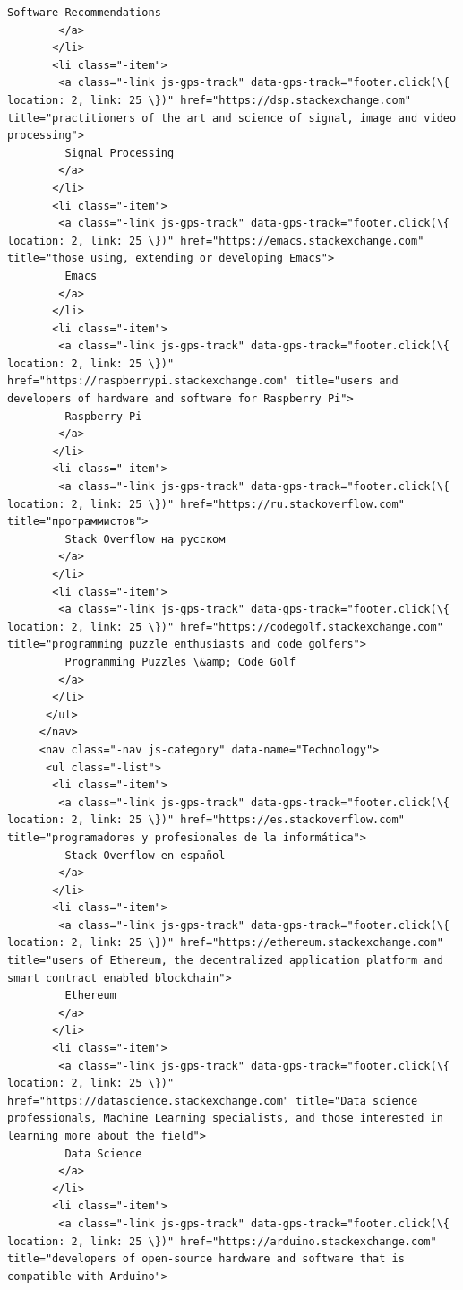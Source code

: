 \documentclass[11pt]{article}
\begin{document}
\begin{Verbatim}[commandchars=\\\{\}]
         Software Recommendations
        </a>
       </li>
       <li class="-item">
        <a class="-link js-gps-track" data-gps-track="footer.click(\{ location: 2, link: 25 \})" href="https://dsp.stackexchange.com" title="practitioners of the art and science of signal, image and video processing">
         Signal Processing
        </a>
       </li>
       <li class="-item">
        <a class="-link js-gps-track" data-gps-track="footer.click(\{ location: 2, link: 25 \})" href="https://emacs.stackexchange.com" title="those using, extending or developing Emacs">
         Emacs
        </a>
       </li>
       <li class="-item">
        <a class="-link js-gps-track" data-gps-track="footer.click(\{ location: 2, link: 25 \})" href="https://raspberrypi.stackexchange.com" title="users and developers of hardware and software for Raspberry Pi">
         Raspberry Pi
        </a>
       </li>
       <li class="-item">
        <a class="-link js-gps-track" data-gps-track="footer.click(\{ location: 2, link: 25 \})" href="https://ru.stackoverflow.com" title="программистов">
         Stack Overflow на русском
        </a>
       </li>
       <li class="-item">
        <a class="-link js-gps-track" data-gps-track="footer.click(\{ location: 2, link: 25 \})" href="https://codegolf.stackexchange.com" title="programming puzzle enthusiasts and code golfers">
         Programming Puzzles \&amp; Code Golf
        </a>
       </li>
      </ul>
     </nav>
     <nav class="-nav js-category" data-name="Technology">
      <ul class="-list">
       <li class="-item">
        <a class="-link js-gps-track" data-gps-track="footer.click(\{ location: 2, link: 25 \})" href="https://es.stackoverflow.com" title="programadores y profesionales de la informática">
         Stack Overflow en español
        </a>
       </li>
       <li class="-item">
        <a class="-link js-gps-track" data-gps-track="footer.click(\{ location: 2, link: 25 \})" href="https://ethereum.stackexchange.com" title="users of Ethereum, the decentralized application platform and smart contract enabled blockchain">
         Ethereum
        </a>
       </li>
       <li class="-item">
        <a class="-link js-gps-track" data-gps-track="footer.click(\{ location: 2, link: 25 \})" href="https://datascience.stackexchange.com" title="Data science professionals, Machine Learning specialists, and those interested in learning more about the field">
         Data Science
        </a>
       </li>
       <li class="-item">
        <a class="-link js-gps-track" data-gps-track="footer.click(\{ location: 2, link: 25 \})" href="https://arduino.stackexchange.com" title="developers of open-source hardware and software that is compatible with Arduino">

\end{Verbatim}
\end{document}

